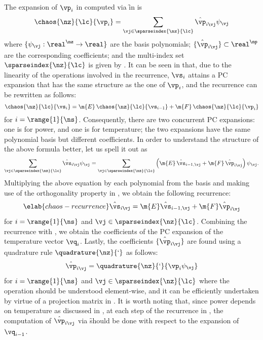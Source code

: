 The expansion of $\vp_i$ in  computed via \f in
 is
\[
  \chaos{\nz}{\lc}{\vp_i} = \sum_{\vj \in \sparseindex{\nz}{\lc}} \hat{\vp}_{i \vj} \psi_{\vj}
\]
where $\{ \psi_{\vj}: \real^\nz \to \real \}$ are the basis polynomials; $\{
\hat{\vp}_{i \vj} \} \subset \real^\np$ are the corresponding coefficients; and
the multi-index set $\sparseindex{\nz}{\lc}$ is given by
. It can be seen in
 that, due to the linearity of the operations
involved in the recurrence, $\vs_i$ attains a \ac{PC} expansion that has the
same structure as the one of $\vp_i$, and the recurrence can be rewritten as
follows:
\[
  \chaos{\nz}{\lc}{\vs_i} = \m{E} \, \chaos{\nz}{\lc}{\vs_{i - 1}} + \m{F} \, \chaos{\nz}{\lc}{\vp_i}
\]
for $i = \range{1}{\ns}$. Consequently, there are two concurrent \ac{PC}
expansions: one is for power, and one is for temperature; the two expansions
have the same polynomial basis but different coefficients. In order to
understand the structure of the above formula better, let us spell it out as
\[
  \sum_{\vj \in \sparseindex{\nz}{\lc}} \hat{\vs}_{i \vj} \psi_{\vj} =
  \sum_{\vj \in \sparseindex{\nz}{\lc}} \left(\m{E} \, \hat{\vs}_{i - 1, \vj} + \m{F} \, \hat{\vp}_{i \vj}\right) \psi_{\vj}.
\]
Multiplying the above equation by each polynomial from the basis and making use
of the orthogonality property in , we obtain the
following recurrence:
\begin{equation} \elab{chaos-recurrence}
  \hat{\vs}_{i \vj} = \m{E} \hat{\vs}_{i - 1, \vj} + \m{F} \hat{\vp}_{i \vj}
\end{equation}
for $i = \range{1}{\ns}$ and $\vj \in \sparseindex{\nz}{\lc}$. Combining the
recurrence with , we obtain the coefficients of the
\ac{PC} expansion of the temperature vector $\vq_i$. Lastly, the coefficients
$\{ \hat{\vp}_{i \vj} \}$ are found using a quadrature rule
$\quadrature{\nz}{\lq}$ as follows:
\[
  \hat{\vp}_{i \vj} = \quadrature{\nz}{\lq}{\vp_i \psi_{\vj}}
\]
for $i = \range{1}{\ns}$ and $\vj \in \sparseindex{\nz}{\lc}$ where the
operation should be understood element-wise, and it can be efficiently
undertaken by virtue of a projection matrix in .
It is worth noting that, since power depends on temperature as discussed in
, at each step of the recurrence in ,
the computation of $\hat{\vp}_{i \vj}$ via \f should be done with respect to the
expansion of $\vq_{i - 1}$.

